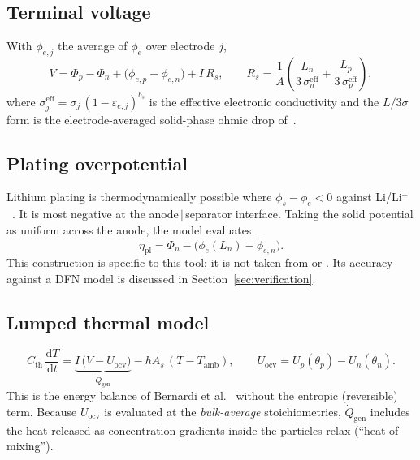 \documentclass[11pt]{article}
\newcommand{\eps}{\varepsilon}
\newcommand{\dd}{\mathrm{d}}
\newcommand{\Tamb}{T_{\mathrm{amb}}}
\newcommand{\etapl}{\eta_{\mathrm{pl}}}
\begin{document}
\subsection{Terminal voltage}
With $\bar\phi_{e,j}$ the average of $\phi_e$ over electrode $j$,
\begin{equation}
V=\Phi_p-\Phi_n+\bigl(\bar\phi_{e,p}-\bar\phi_{e,n}\bigr)+I\,R_{s},\qquad
R_s=\frac{1}{A}\left(\frac{L_n}{3\,\sigma_n^{\mathrm{eff}}}+\frac{L_p}{3\,\sigma_p^{\mathrm{eff}}}\right),\label{eq:V}
\end{equation}
where $\sigma_j^{\mathrm{eff}}=\sigma_j\,(1-\eps_{e,j})^{b_s}$ is the effective electronic conductivity and the $L/3\sigma$ form is the electrode-averaged solid-phase ohmic drop of~\cite{marquis2019}.

\subsection{Plating overpotential}
Lithium plating is thermodynamically possible where $\phi_s-\phi_e<0$ against Li/Li$^+$~\cite{arora1999}. It is most negative at the anode\,$|$\,separator interface. Taking the solid potential as uniform across the anode, the model evaluates
\begin{equation}
\etapl=\Phi_n-\bigl(\phi_e(L_n)-\bar\phi_{e,n}\bigr). \label{eq:etapl}
\end{equation}
This construction is specific to this tool; it is not taken from \cite{moura2017} or \cite{marquis2019}. Its accuracy against a DFN model is discussed in Section~\ref{sec:verification}.

\subsection{Lumped thermal model}
\begin{equation}
C_{\mathrm{th}}\,\frac{\dd T}{\dd t}=\underbrace{I\,\bigl(V-U_{\mathrm{ocv}}\bigr)}_{\dot Q_{\mathrm{gen}}}-hA_s\,(T-\Tamb),\qquad
U_{\mathrm{ocv}}=U_p(\bar\theta_p)-U_n(\bar\theta_n). \label{eq:thermal}
\end{equation}
This is the energy balance of Bernardi et al.~\cite{bernardi1985} without the entropic (reversible) term. Because $U_{\mathrm{ocv}}$ is evaluated at the \emph{bulk-average} stoichiometries, $\dot Q_{\mathrm{gen}}$ includes the heat released as concentration gradients inside the particles relax (``heat of mixing'').
\end{document}

